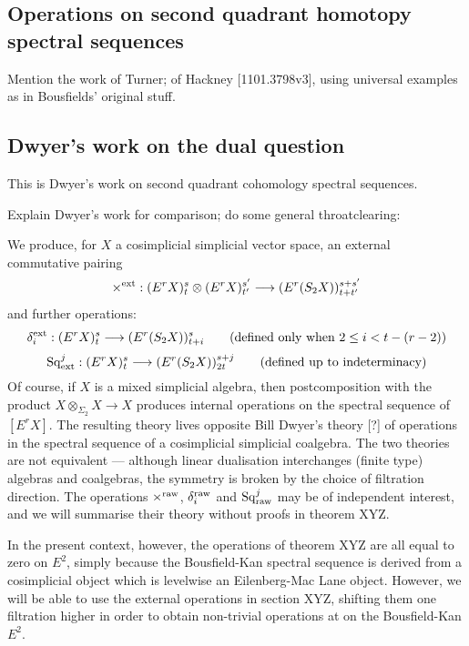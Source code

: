 \documentclass[11pt]{amsart}
\theoremstyle{plain}
\theoremstyle{definition}
\renewcommand{\to}{\longrightarrow}
\theoremstyle{plain}
\newcommand{\Sq}{\mathrm{Sq}}
\begin{document}
\begin{second quadrant homotopy}

\section{\textbf{Operations on second quadrant homotopy spectral sequences}}\label{second quadrant homotopy}


Mention the work of Turner; of Hackney [1101.3798v3], using universal examples as in Bousfields'  original stuff.


\subsection{Dwyer's work on the dual question}
This is Dwyer's work on second quadrant cohomology spectral sequences.

Explain Dwyer's work for comparison; do some general throatclearing: 
\begin{shaded}\tiny
We produce, for $X$ a cosimplicial simplicial vector space, an external commutative pairing
\[\times^\textup{ext}:(E^rX)^s_{t}\otimes (E^rX)_{t'}^{s'}\to (E^r(S_2X))^{s+s'}_{t+t'}\]
and further operations:
\[\delta_i^\textup{ext}:(E^rX)^s_{t}\to (E^r(S_2X))^{s}_{t+i}\textup{\qquad (defined only when $2\leq i<t-(r-2)$)}\]
\[\Sq^j_\textup{ext}:(E^rX)^s_{t}\to (E^r(S_2X))^{s+j}_{2t}\textup{\qquad (defined up to indeterminacy)}\]
Of course, if $X$ is a mixed simplicial algebra, then postcomposition with the product $X\otimes_{\Sigma_2}X\to X$ produces internal operations on the spectral sequence of $[E^rX]$. The resulting theory lives opposite Bill Dwyer's theory [?] of operations in the spectral sequence of a cosimplicial simplicial coalgebra. The two theories are not equivalent --- although linear dualisation interchanges (finite type) algebras and coalgebras, the symmetry is broken by the choice of filtration direction. The operations $\times^\textup{raw}$, $\delta_i^\textup{raw}$ and $\Sq^j_\textup{raw}$ may be of independent interest, and we will summarise their theory without proofs in theorem XYZ.

In the present context, however, the operations of theorem XYZ are all equal to zero on $E^2$, simply because the Bousfield-Kan spectral sequence is derived from a cosimplicial object which is levelwise an Eilenberg-Mac Lane object. However, we will be able to use the external operations in section XYZ, shifting them one filtration higher in order to obtain non-trivial operations at on the Bousfield-Kan $E^2$.



\end{shaded}
\end{second quadrant homotopy}
\end{document}
